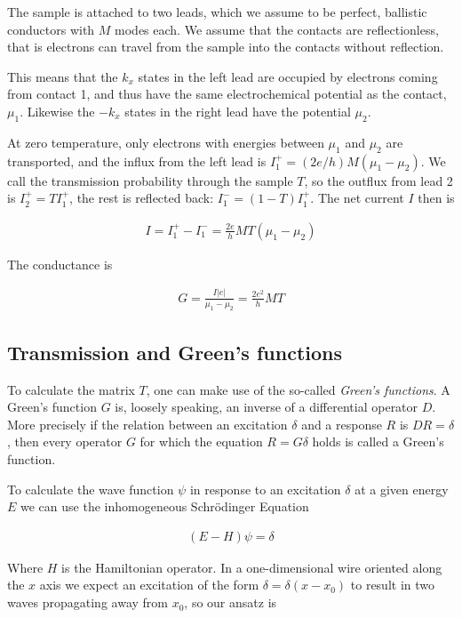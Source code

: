 \documentclass[11pt]{report}
\begin{document}
The sample is attached to two leads, which we assume to be perfect, ballistic
conductors with $M$ modes each. We assume that the contacts are
reflectionless, that is electrons can travel from the sample into the contacts
without reflection.

This means that the $k_x$ states in the left lead are occupied by electrons
coming from contact 1, and thus have the same electrochemical potential as
the contact, $\mu_1$. Likewise the $-k_x$ states in the right lead have the
potential $\mu_2$.

At zero temperature, only electrons with energies between $\mu_1$ and $\mu_2$
are transported, and the influx from the left lead is
$I_1^+ = (2e/h)M(\mu_1-\mu_2)$. We call the transmission probability through
the sample $T$, so the outflux from lead 2 is $I_2^+ = T I_1^+$, the rest
is reflected back: $I_1^- = (1-T) I_1^+$. The net current $I$ then is

\begin{align}
    I = I_1^+ - I_1^- = \frac{2e}{h} M T (\mu_1 - \mu_2)
\end{align}

The conductance is

\begin{align}
    G = \frac{I |e|}{\mu_1 - \mu_2} = \frac{2 e^2}{h} MT
\end{align}

\subsection*{Transmission and Green's functions}

To calculate the matrix $T$, one can make use of the so-called \emph{Green's
functions}. A Green's function $G$ is, loosely speaking, an inverse of a
differential operator $D$. More precisely if the relation between an
excitation $\delta$ and a response $R$ is $D R = \delta$, then every
operator $G$ for
which the equation $R = G \delta$ holds is called a Green's function.

To calculate the wave function $\psi$ in response to an excitation $\delta$ at a
given energy $E$ we can use the inhomogeneous Schrödinger Equation

\begin{align}
    \label{eq:green-define}
    (E - H) \psi = \delta
\end{align}

Where $H$ is the Hamiltonian operator. In a one-dimensional wire oriented
along the $x$ axis we expect an excitation of the form
$\delta = \delta(x - x_0)$ to result in two waves propagating away from $x_0$,
so our ansatz is
\end{document}

